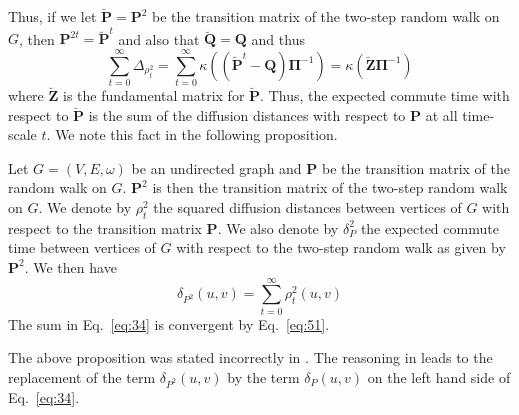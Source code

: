 Thus, if we let $\breve{\mathbf{P}} = \mathbf{P}^{2}$ be the transition matrix
of the two-step random walk on $G$, then $\mathbf{P}^{2t} =
\breve{\mathbf{P}}^{t}$ and also that $\breve{\mathbf{Q}} = \mathbf{Q}$ and thus
\begin{equation}
  \label{eq:51}
  \sum_{t = 0}^{\infty} \Delta_{\rho_{t}^{2}} = \sum_{t = 0}^{\infty}
  \kappa((\breve{\mathbf{P}}^{t} - \mathbf{Q})\bm{\Pi}^{-1}) =
  \kappa(\breve{\mathbf{Z}} \bm{\Pi}^{-1})
\end{equation}
where $\breve{\mathbf{Z}}$ is the fundamental matrix for
$\breve{\mathbf{P}}$. Thus, the expected commute time with respect to
$\breve{\mathbf{P}}$ is the
sum of the diffusion distances with respect to $\mathbf{P}$ at all
time-scale $t$. We note this fact in the following proposition.
\begin{proposition}
  \label{prop:17}
  Let $G = (V,E,\omega)$ be an undirected graph and $\mathbf{P}$ be
  the transition matrix of the random walk on $G$. $\mathbf{P}^{2}$ is
  then the transition matrix of the two-step random walk on $G$. We
  denote by $\rho_{t}^{2}$ the squared diffusion distances between
  vertices of $G$ with respect to the transition matrix
  $\mathbf{P}$. We also denote by $\delta_P^{2}$ the expected commute
  time between vertices of $G$ with respect to the two-step random
  walk as given by $\mathbf{P}^{2}$. We then have
  \begin{equation}
    \label{eq:34}
    \delta_{P^{2}}(u,v) = \sum_{t = 0}^{\infty}{\rho_{t}^{2}(u,v)}
  \end{equation}
  The sum in Eq.~\eqref{eq:34} is convergent by Eq.~\eqref{eq:51}.
\end{proposition}
The above proposition was stated incorrectly in 
\citep{qui07:_clust}. The reasoning in
\citep{qui07:_clust} leads to the replacement of the term
$\delta_{P^2}(u,v)$ by the term $\delta_{P}(u,v)$ on the left hand
side of Eq.~\eqref{eq:34}. 
%
%
